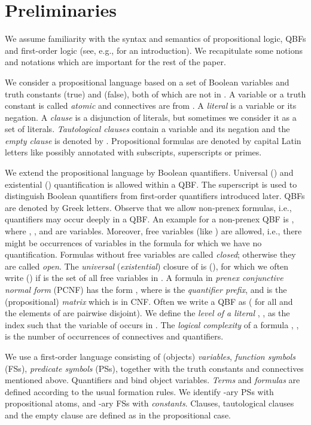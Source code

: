 \documentclass{llncs}
\begin{document}
\section{Preliminaries}\label{sec:prel}


We assume familiarity with the syntax and semantics of propositional
logic, QBFs and first-order logic (see, e.g.,
\cite{Leitsch-resolution1997} for an introduction). We recapitulate
some notions and notations which are important for the rest of the
paper.

We consider a propositional language based on a set  of
Boolean variables and truth constants  (true) and 
(false), both of which are not in . A variable or a truth
constant is called \emph{atomic} and connectives are from .
A \emph{literal} is a variable or its negation.  A \emph{clause} is a
disjunction of literals, but sometimes we consider it as a set of
literals. \emph{Tautological clauses} contain a variable and its
negation and the \emph{empty clause} is denoted by .
Propositional formulas are denoted by capital Latin letters like  possibly annotated with subscripts, superscripts or primes.

We extend the propositional language by Boolean quantifiers.
Universal () and existential () quantification
is allowed within a QBF.  The superscript  is used to distinguish
Boolean quantifiers from first-order quantifiers introduced later.
QBFs are denoted by Greek letters.  Observe that we allow non-prenex
formulas, i.e., quantifiers may occur deeply in a QBF.
An example for a non-prenex QBF is
, where , ,  and  are variables.  Moreover, free
variables (like ) are allowed, i.e., there might be occurrences of
variables in the formula for which we have no quantification. Formulas
without free variables are called \emph{closed}; otherwise they are
called \emph{open}. The \emph{universal} (\emph{existential}) closure
of  is 
(), for which we often
write  () if
 is the set of all free variables in
.  A formula in \emph{prenex conjunctive normal form} (PCNF)
has the form , where  is the \emph{quantifier prefix},  and  is the (propositional) \emph{matrix} which is in CNF.
Often we write a QBF as  ( for all  and the elements of  are pairwise disjoint). We define the \emph{level of a
  literal }, , as the index  such that the
variable of  occurs in .  The \emph{logical complexity} of a
formula , , is the number of occurrences of
connectives and quantifiers.

We use a first-order language consisting of (objects) {\em variables},
\emph{function symbols} (FSs), \emph{predicate symbols} (PSs),
together with the truth constants and connectives mentioned above.
Quantifiers  and  bind object variables.  \emph{
  Terms} and \emph{formulas} are defined according to the usual
formation rules.  We identify -ary PSs with
propositional atoms, and -ary FSs with
\emph{constants}. Clauses, tautological clauses and the empty clause
are defined as in the propositional case.
\end{document}
